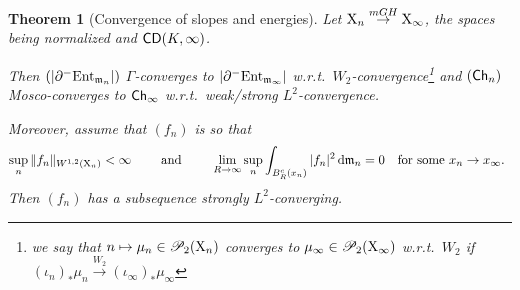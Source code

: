 \documentclass[11pt]{article}
\numberwithin{equation}{section}
\newtheorem{theorem}{Theorem}[section]
\newcommand{\prd}{\mathscr P_2}
\newcommand{\X}{{\rm X}}
\newcommand{\mm}{{\mathfrak m}}
\newcommand{\CD}{{\sf CD}}
\newcommand{\ch}{{\sf Ch}}
\newcommand{\entm}[1]{{\rm Ent}_{#1}}
\renewcommand{\d}{{\rm d}}
\begin{document}
\begin{theorem}[Convergence of slopes and  energies]\label{thm:convslen} Let $\X_n \stackrel{mGH}\to \X_\infty $, the spaces being normalized and $\CD(K,\infty)$.

Then $(|\partial^-\entm{\mm_n}|)$ $\Gamma$-converges to $|\partial^-\entm{\mm_\infty}|$ w.r.t.\ $W_2$-convergence\footnote{we say that $n\mapsto\mu_n\in \prd(\X_n)$ converges to $\mu_\infty\in\prd(\X_\infty)$ w.r.t.\ $W_2$ if $(\iota_n)_*\mu_n\stackrel{W_2}\to(\iota_\infty)_*\mu_\infty$} and $(\ch_n )$ Mosco-converges to $\ch_\infty$ w.r.t.\ weak/strong $L^2$-convergence.

Moreover, assume that $(f_n)$ is so that
\begin{equation}
\label{eq:perfortecomp}
\sup_n\|f_n\|_{W^{1,2}(\X_n)}<\infty\qquad\text{ and }\qquad \lim_{R\to\infty}\sup_n\int_{B_R^c(x_n)} |f_n|^2\,\d\mm_n=0\quad\text{for some $x_n\to x_\infty$. }
\end{equation}
Then $(f_n)$ has a subsequence strongly $L^2$-converging.
\end{theorem}
\end{document}
